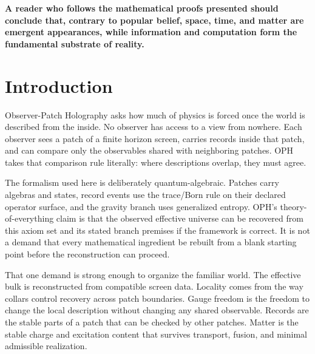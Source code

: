 \documentclass[11pt]{article}
\begin{document}
\begin{center}
\begin{minipage}{0.88\textwidth}
\centering
\bfseries
A reader who follows the mathematical proofs presented should conclude that, contrary to popular belief, space, time, and matter are emergent appearances, while information and computation form the fundamental substrate of reality.
\end{minipage}
\end{center}
	
\tableofcontents
\newpage

\section{Introduction}

Observer-Patch Holography asks how much of physics is forced once the world is described from the
inside. No observer has access to a view from nowhere. Each observer sees a patch of a finite
horizon screen, carries records inside that patch, and can compare only the observables shared with
neighboring patches. OPH takes that comparison rule literally: where descriptions overlap, they must
agree.

The formalism used here is deliberately quantum-algebraic. Patches carry algebras and states,
record events use the trace/Born rule on their declared operator surface, and the gravity branch
uses generalized entropy. OPH's theory-of-everything claim is that the observed effective universe
can be recovered from this axiom set and its stated branch premises if the framework is correct.
It is not a demand that every mathematical ingredient be rebuilt from a blank starting point
before the reconstruction can proceed.

That one demand is strong enough to organize the familiar world. The effective bulk is reconstructed
from compatible screen data. Locality comes from the way collars control recovery across patch
boundaries. Gauge freedom is the freedom to change the local description without changing any shared
observable. Records are the stable parts of a patch that can be checked by other patches. Matter is
the stable charge and excitation content that survives transport, fusion, and minimal admissible
realization.
\end{document}
